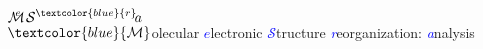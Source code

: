 \documentclass[10pt]{article}
\begin{document}
\begin{center}
\huge{\textcolor{blue}{$\displaystyle{\mathcal{M} \!\!\!\!^e\,\,\mathcal{S}^{\scriptsize{\textcolor{blue}{r}}}\! a}$}}
 \\$\;$\\ \normalsize{$\textcolor{blue}{\mathcal{M}}$olecular \textcolor{blue}{$e$}lectronic \textcolor{blue}{$\mathcal{S}$}tructure \textcolor{blue}{{\textit{r}}}eorganization:  \textcolor{blue}{\textit{a}}nalysis}
\end{center}
\end{document}
